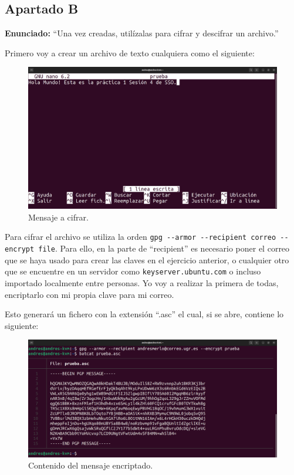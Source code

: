 \documentclass{article}
\begin{document}
{}
\subsection*{Apartado B}

\textbf{Enunciado: }``Una vez creadas, utilízalas para cifrar y descifrar un archivo.''

\bigskip

Primero voy a crear un archivo de texto cualquiera como el siguiente:

\begin{figure}[H]
    \includegraphics[width=\textwidth]{imagenes/Captura desde 2022-10-19 16-57-15.png}
    \caption{Mensaje a cifrar.}
\end{figure}

Para cifrar el archivo se utiliza la orden \verb|gpg --armor --recipient correo --encrypt file|. Para ello, en la parte de ``recipient'' es necesario poner el correo que se haya usado para crear las claves en el ejercicio anterior, o cualquier otro que se encuentre en un servidor como \verb|keyserver.ubuntu.com| o incluso importado localmente entre personas. Yo voy a realizar la primera de todas, encriptarlo con mi propia clave para mi correo.

\bigskip

Esto generará un fichero con la extensión ``.asc'' el cual, si se abre, contiene lo siguiente:

\begin{figure}[H]
    \includegraphics[width=\textwidth]{imagenes/Portatil/Captura desde 2022-10-27 18-34-40.png}
    \caption{Contenido del mensaje encriptado.}
\end{figure}
\end{document}
